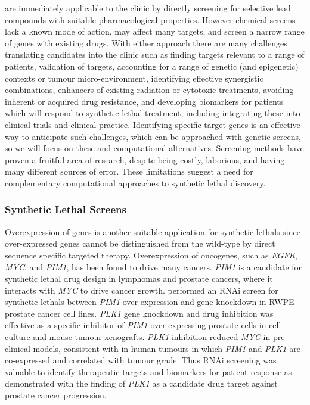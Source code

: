  are immediately applicable to the clinic by directly screening for selective lead compounds with suitable pharmacological properties. However chemical screens lack a known mode of action, may affect many targets, and screen a narrow range of genes with existing drugs. With either approach there are many challenges translating candidates into the clinic such as finding targets relevant to a range of patients, validation of targets, accounting for a range of genetic (and epigenetic) contexts or tumour micro-environment, identifying effective synergistic combinations, enhancers of existing radiation or cytotoxic \glspl{treatment}, avoiding inherent or acquired drug resistance, and developing biomarkers for patients which will respond to \gls{synthetic lethal} treatment, including integrating these into clinical trials and clinical practice. Identifying specific target genes is an effective way to anticipate such challenges, which can be approached with genetic screens, so we will focus on these and computational alternatives. Screening methods have proven a fruitful area of research, despite being costly, laborious, and having many different sources of error. These limitations suggest a need for complementary computational approaches to \gls{synthetic lethal} discovery.  

\subsubsection{Synthetic Lethal Screens}

Overexpression of genes is another suitable application for \glspl{synthetic lethal} since over-expressed genes cannot be distinguished from the \gls{wild-type} by direct sequence specific \gls{targeted therapy}. Overexpression of \glspl{oncogene}, such as \textit{EGFR}, \textit{MYC}, and \textit{PIM1}, has been found to drive many cancers. \textit{PIM1} is a candidate for \gls{synthetic lethal} drug design in lymphomas and prostate cancers, where it interacts with \textit{MYC} to drive cancer growth. \citet{vanderMeer2014} performed an \gls{RNAi} screen for \glspl{synthetic lethal} between \textit{PIM1} over-expression and gene knockdown in RWPE prostate cancer cell lines. \textit{PLK1} gene knockdown and drug inhibition was effective as a specific inhibitor of \textit{PIM1} over-expressing prostate cells in cell culture and mouse tumour xenografts. \textit{PLK1} inhibition reduced \textit{MYC}  in pre-clinical models, consistent with  in human \glspl{tumour} in which \textit{PIM1} and \textit{PLK1} are co-expressed and correlated with tumour grade. Thus \gls{RNAi} screening was valuable to identify therapeutic targets and biomarkers for patient response as demonstrated with the finding of \textit{PLK1} as a candidate drug target against prostate cancer progression.  


